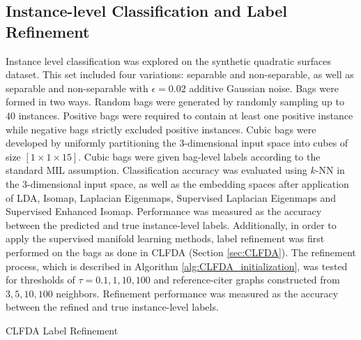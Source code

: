\subsection{Instance-level Classification and Label Refinement}
Instance level classification was explored on the synthetic quadratic surfaces dataset.  This set included four variations: separable and non-separable, as well as separable and non-separable with $\epsilon=0.02$ additive Gaussian noise.   Bags were formed in two ways.  Random bags were generated by randomly sampling up to $40$ instances.  Positive bags were required to contain at least one positive instance while negative bags strictly excluded positive instances.  Cubic bags were developed by uniformly partitioning the 3-dimensional input space into cubes of size $[1 \times 1 \times 15]$.  Cubic bags were given bag-level labels according to the standard MIL assumption. Classification accuracy was evaluated using $k$-NN in the 3-dimensional input space, as well as the embedding spaces after application of LDA, Isomap, Laplacian Eigenmaps, Supervised Laplacian Eigenmaps and Supervised Enhanced Isomap.  Performance was measured as the accuracy between the predicted and true instance-level labels.  Additionally, in order to apply the supervised manifold learning methods, label refinement was first performed on the bags as done in CLFDA (Section \ref{sec:CLFDA}).  The refinement process, which is described in Algorithm \ref{alg:CLFDA_initialization}, was tested for thresholds of $\tau=0.1,1,10,100$ and reference-citer graphs constructed from $3,5,10,100$ neighbors. Refinement performance was measured as the accuracy between the refined and true instance-level labels.

\begin{algorithm}[h!]
	\caption{CLFDA Label Refinement}
	\label{alg:CLFDA_initialization}
	\begin{algorithmic}[1]
		\Else
		\EndIf
		\EndFor             
	\end{algorithmic}
\end{algorithm}


